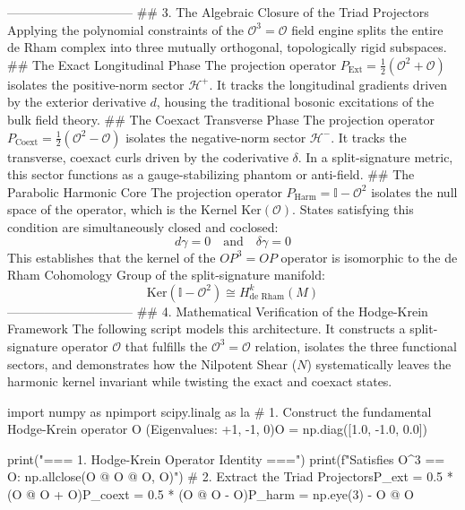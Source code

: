 ------------------------------
## 3. The Algebraic Closure of the Triad Projectors
Applying the polynomial constraints of the $\mathcal{O}^3 = \mathcal{O}$ field engine splits the entire de Rham complex into three mutually orthogonal, topologically rigid subspaces.
## The Exact Longitudinal Phase
The projection operator $P_{\text{Ext}} = \frac{1}{2}(\mathcal{O}^2 + \mathcal{O})$ isolates the positive-norm sector $\mathcal{H}^+$. It tracks the longitudinal gradients driven by the exterior derivative $d$, housing the traditional bosonic excitations of the bulk field theory.
## The Coexact Transverse Phase
The projection operator $P_{\text{Coext}} = \frac{1}{2}(\mathcal{O}^2 - \mathcal{O})$ isolates the negative-norm sector $\mathcal{H}^-$. It tracks the transverse, coexact curls driven by the coderivative $\delta$. In a split-signature metric, this sector functions as a gauge-stabilizing phantom or anti-field.
## The Parabolic Harmonic Core
The projection operator $P_{\text{Harm}} = \mathbb{I} - \mathcal{O}^2$ isolates the null space of the operator, which is the Kernel $\text{Ker}(\mathcal{O})$. States satisfying this condition are simultaneously closed and coclosed:
$$d\gamma = 0 \quad \text{and} \quad \delta\gamma = 0$$ 
This establishes that the kernel of the $OP^3=OP$ operator is isomorphic to the de Rham Cohomology Group of the split-signature manifold:
$$\text{Ker}(\mathbb{I} - \mathcal{O}^2) \cong H_{\text{de Rham}}^k(M)$$ 
------------------------------
## 4. Mathematical Verification of the Hodge-Krein Framework
The following script models this architecture. It constructs a split-signature operator $\mathcal{O}$ that fulfills the $\mathcal{O}^3 = \mathcal{O}$ relation, isolates the three functional sectors, and demonstrates how the Nilpotent Shear ($N$) systematically leaves the harmonic kernel invariant while twisting the exact and coexact states.

import numpy as npimport scipy.linalg as la
# 1. Construct the fundamental Hodge-Krein operator O (Eigenvalues: +1, -1, 0)O = np.diag([1.0, -1.0, 0.0])

print("=== 1. Hodge-Krein Operator Identity ===")
print(f"Satisfies O^3 == O: {np.allclose(O @ O @ O, O)}")
# 2. Extract the Triad ProjectorsP_ext = 0.5 * (O @ O + O)P_coext = 0.5 * (O @ O - O)P_harm = np.eye(3) - O @ O

